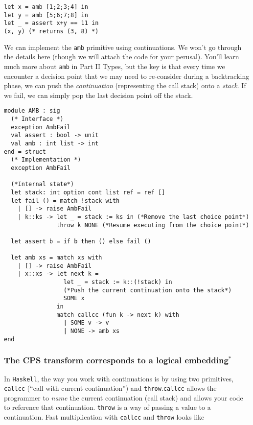 \begin{code}
\label{code:amb-specification}
\begin{verbatim}
let x = amb [1;2;3;4] in
let y = amb [5;6;7;8] in
let _ = assert x+y == 11 in
(x, y) (* returns (3, 8) *)
\end{verbatim}
\end{code}

We can implement the \texttt{amb} primitive using continuations. We won't go through the details here (though we will attach the code for your perusal). You'll learn much more about \texttt{amb} in {\sffamily Part II Types}, but the key is that every time we encounter a decision point that we may need to re-consider during a backtracking phase, we can push the \emph{continuation} (representing the call stack) onto a \emph{stack}. If we fail, we can simply pop the last decision point off the stack. 

\begin{code}
\label{code:amb-specification}
\begin{verbatim}
module AMB : sig
  (* Interface *)
  exception AmbFail
  val assert : bool -> unit
  val amb : int list -> int
end = struct
  (* Implementation *)
  exception AmbFail

  (*Internal state*)
  let stack: int option cont list ref = ref []
  let fail () = match !stack with
    | [] -> raise AmbFail
    | k::ks -> let _ = stack := ks in (*Remove the last choice point*)
               throw k NONE (*Resume executing from the choice point*)
  
  let assert b = if b then () else fail ()

  let amb xs = match xs with
    | [] -> raise AmbFail
    | x::xs -> let next k = 
                 let _ = stack := k::(!stack) in 
                 (*Push the current continuation onto the stack*)
                 SOME x
               in
               match callcc (fun k -> next k) with
                 | SOME v -> v 
                 | NONE -> amb xs 
end
\end{verbatim}
\end{code}

\subsubsection{The CPS transform corresponds to a logical embedding$^{*}$}
In \texttt{Haskell}, the way you work with continuations is by using two primitives, \texttt{callcc} (``call with current continuation'') and \texttt{throw}.\texttt{callcc} allows the programmer to \emph{name} the current continuation (call stack) and allows your code to reference that continuation. \texttt{throw} is a way of passing a value to a continuation. Fast multiplication with \texttt{callcc} and \texttt{throw} looks like

